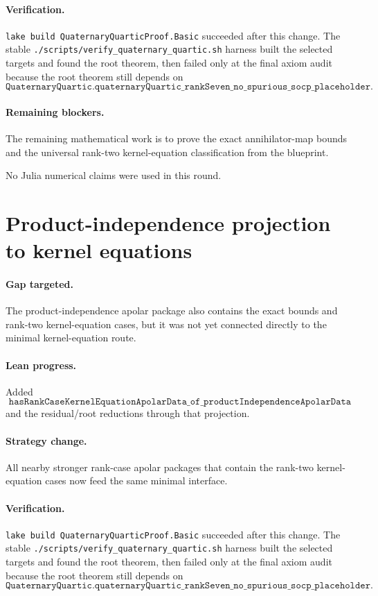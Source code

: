 \documentclass[11pt]{article}
\begin{document}
\paragraph{Verification.}
\texttt{lake build QuaternaryQuarticProof.Basic} succeeded after this change.
The stable \texttt{./scripts/verify\_quaternary\_quartic.sh} harness built the
selected targets and found the root theorem, then failed only at the final axiom
audit because the root theorem still depends on
\[
\texttt{QuaternaryQuartic.quaternaryQuartic\_rankSeven\_no\_spurious\_socp\_placeholder}.
\]

\paragraph{Remaining blockers.}
The remaining mathematical work is to prove the exact annihilator-map bounds
and the universal rank-two kernel-equation classification from the blueprint.

No Julia numerical claims were used in this round.

\section*{Product-independence projection to kernel equations}

\paragraph{Gap targeted.}
The product-independence apolar package also contains the exact bounds and
rank-two kernel-equation cases, but it was not yet connected directly to the
minimal kernel-equation route.

\paragraph{Lean progress.}
Added
\[
\texttt{hasRankCaseKernelEquationApolarData\_of\_productIndependenceApolarData}
\]
and the residual/root reductions through that projection.

\paragraph{Strategy change.}
All nearby stronger rank-case apolar packages that contain the rank-two
kernel-equation cases now feed the same minimal interface.

\paragraph{Verification.}
\texttt{lake build QuaternaryQuarticProof.Basic} succeeded after this change.
The stable \texttt{./scripts/verify\_quaternary\_quartic.sh} harness built the
selected targets and found the root theorem, then failed only at the final axiom
audit because the root theorem still depends on
\[
\texttt{QuaternaryQuartic.quaternaryQuartic\_rankSeven\_no\_spurious\_socp\_placeholder}.
\]
\end{document}
